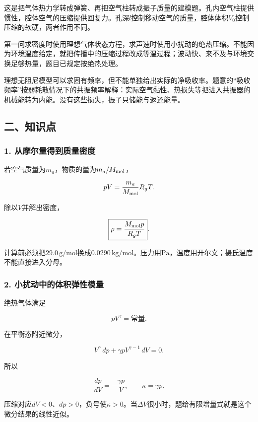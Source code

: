 \documentclass[12pt,a4paper,fontset=fandol]{ctexart}
\begin{document}
这是把气体热力学转成弹簧、再把空气柱转成振子质量的建模题。孔内空气柱提供惯性，腔体空气的压缩提供回复力。孔深\(l\)控制移动空气的质量，腔体体积\(V_0\)控制压缩的软硬，两者作用不同。

第一问求密度时使用理想气体状态方程，求声速时使用小扰动的绝热压缩。不能因为环境温度给定，就把传播中的压缩过程改成等温过程；波动快、来不及与环境交换足够热量，题目已规定按绝热处理。

理想无阻尼模型可以求固有频率，但不能单独给出实际的净吸收率。题意的``吸收频率''按弱耗散情况下的共振频率解释：实际空气黏性、热损失等把进入共振器的机械能转为内能。没有这些损失，振子只储能与返还能量。

\subsection{二、知识点}\label{ux4e8cux77e5ux8bc6ux70b9-3}

\subsubsection{1.
从摩尔量得到质量密度}\label{ux4eceux6469ux5c14ux91cfux5f97ux5230ux8d28ux91cfux5bc6ux5ea6}

若空气质量为\(m_a\)，物质的量为\(m_a/M_{\rm mol}\)，

\[
pV=\frac{m_a}{M_{\rm mol}}R_gT.
\]

除以\(V\)并解出密度，

\[
\boxed{\rho=\frac{M_{\rm mol}p}{R_gT}}.
\]

计算前必须把\(29.0\,\mathrm{g/mol}\)换成\(0.0290\,\mathrm{kg/mol}\)。压力用\(\mathrm{Pa}\)，温度用开尔文；摄氏温度不能直接进入分母。

\subsubsection{2.
小扰动中的体积弹性模量}\label{ux5c0fux6270ux52a8ux4e2dux7684ux4f53ux79efux5f39ux6027ux6a21ux91cf}

绝热气体满足

\[
pV^\gamma=\text{常量}.
\]

在平衡态附近微分，

\[
V^\gamma\,dp+\gamma pV^{\gamma-1}\,dV=0.
\]

所以

\[
\frac{dp}{dV}=-\frac{\gamma p}{V},
\qquad
\boxed{\kappa=\gamma p}.
\]

压缩对应\(dV<0\)、\(dp>0\)，负号使\(\kappa>0\)。当\(\Delta V\)很小时，题给有限增量式就是这个微分结果的线性近似。
\end{document}

